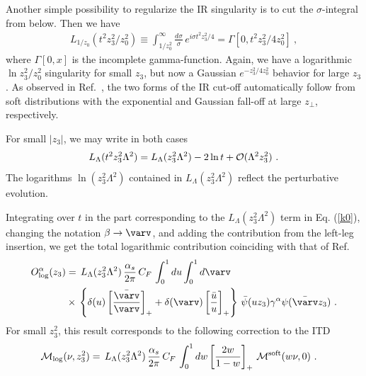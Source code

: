 \documentclass[final,5p,times,twocolumn]{elsarticle}
\newcommand{\nn}{\nonumber \\ }
\begin{document}
 Another simple possibility  to regularize the IR 
 singularity is to cut the $\sigma$-integral from below. Then we have 
    \begin{align} 
    L_{1/z_0}  (t^2z_3^2 /z_0^2)  \equiv 
 \int_{1/z_0^2}^\infty    \frac{d \sigma }{ \sigma }\,  e^{  i \sigma  t^2  z_3^2/4} =
 \Gamma[0, t^2z_3^2/4 z_0^2 ] \   ,
    \label{LzL}
 \end{align}
 where $\Gamma[0,x]$ is the incomplete gamma-function.
 Again, we have   a logarithmic $\ln z_3^2 /z_0^2$ singularity
  for small $z_3$, but  now  
 a Gaussian $e^{-z_3^2 /4z_0^2}$ behavior for large $z_3$.
 As observed in \mbox{Ref. \cite{Radyushkin:2015gpa},}
 the two forms of the IR cut-off automatically 
 follow from   soft distributions with the exponential and Gaussian 
 fall-off at large $z_\perp$, respectively. 
 
 
 For small $|z_3|$, we may write   in both cases  
    \begin{align} 
  L_ \Lambda  (t^2 z_3^2 \Lambda^2)=  L_ \Lambda ( z_3^2 \Lambda^2) - 2  \ln t + {\cal O} (\Lambda^2 z_3^2) \  . 
  \label{k0} 
   \end{align}
The logarithms  $\ln (z_3^2  \Lambda^2)$  contained in  $ L_\Lambda  ( z_3^2  \Lambda^2)$ 
 reflect  the perturbative  evolution.  

Integrating over $t$ in the part corresponding to the $ L_ \Lambda  ( z_3^2  \Lambda^2) $  
term in Eq. (\ref{k0}), 
 changing the  notation $\beta \to \varv$, and adding the contribution from the left-leg insertion,  we get 
     the total  logarithmic  contribution  coinciding with  that of Ref.  \cite{Balitsky:1987bk} 
    \begin{align} 
  O^\alpha_{\rm  log}  (z_3) & =     \,    L_ \Lambda  ( z_3^2  \Lambda^2) \,   
   \frac{ \alpha_s}{2\pi} \, C_F
 \,\int_0^1  du \int_0^1  d\varv \nn & \times  \, \left \{ \delta (u) \left[ \frac{\bar \varv }{\varv }\right ] _+
 + \delta (\varv) \left[ \frac{\bar u }{u }\right ] _+   \right \} \, \bar \psi (u z_3) \gamma^\alpha \psi (\bar \varv z_3) 
     \ .
    \label{Logtot}
 \end{align}
  For small $z_3^2$, this  result corresponds to the following correction to the ITD
    \begin{align} 
  {\cal M}_{\rm  log}  (\nu,  z_3^2) & =     \,    L_ \Lambda  ( z_3^2  \Lambda^2) \,    \frac{ \alpha_s}{2\pi} \, C_F
 \,\int_0^1  dw 
 \left[ \frac{2 w }{1-w }\right ] _+  \,      {\cal M}^{\rm soft}   (w \nu,  0)  \ .
    \label{LogtotM}
 \end{align}
\end{document}
